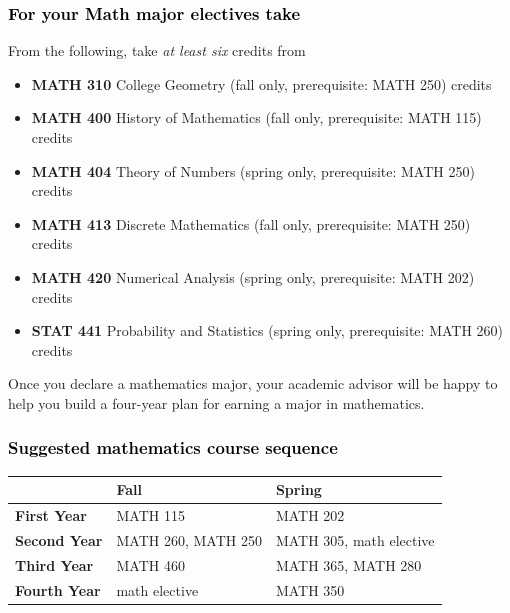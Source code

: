 \documentclass[10pt]{article}
\newcommand{\calconeshort}{MATH 115}
\newcommand{\calctwoshort}{MATH 202}
\newcommand{\foundationsshort}{MATH 250}
\newcommand{\calcthreeshort}{MATH 260}
\newcommand{\linearshort}{MATH 280}
\newcommand{\discrete}{\textbf{MATH 413} Discrete Mathematics  (fall only, prerequisite: MATH 250)\dotfill 3 credits}
\newcommand{\statistics}{\textbf{STAT 441} Probability and Statistics (spring only, prerequisite: MATH 260)  \dotfill  3 credits}
\newcommand{\diffeqshort}{MATH 305}
\newcommand{\abstractalgebrashort}{MATH 350}
\newcommand{\complexshort}{MATH 365}
\newcommand{\advancedcalcshort}{MATH 460}
\newcommand{\numerical}{\textbf{MATH 420}   Numerical Analysis   (spring only, prerequisite: MATH 202)\dotfill 3 credits}
\newcommand{\collegegeometry}{\textbf{MATH 310}	College Geometry (fall only,  prerequisite: MATH 250) \dotfill 3 credits}
\newcommand{\mathhistory}{\textbf{MATH 400} History of Mathematics (fall only,  prerequisite: MATH 115) \dotfill 3 credits}
\newcommand{\numbertheory}{\textbf{MATH 404} Theory of Numbers (spring only,  prerequisite: MATH 250) \dotfill 3 credits}
\newcommand{\mathBS}{
     \begin{center}
         \begin{tabular}[h]{| l | l | l|} 
            \hline
                       & \textbf{Fall}         &  \textbf{Spring}  \\ \hline 
            \textbf{First Year} & \calconeshort{}  & \calctwoshort \\  \hline
            \textbf{Second Year} &  \calcthreeshort{}, \foundationsshort & \diffeqshort, math elective \\ \hline
            \textbf{Third Year} & \advancedcalcshort              &  \complexshort{}, \linearshort \\ \hline
            \textbf{Fourth Year} & math elective &  \abstractalgebrashort  \\ \hline
         \end{tabular}
\end{center}}
\begin{document}
\subsubsection*{\textcolor{black}{For your Math major electives take}}

From the following, take \emph{at least six} credits from
\vspace{0.1in}

\begin{itemize}
\item \collegegeometry
\item \mathhistory
\item \numbertheory
\item \discrete
\item \numerical
\item \statistics
\end{itemize}

Once you declare a mathematics major, your academic advisor 
will be happy to help you build a four-year plan for earning a major 
in mathematics.

\subsubsection*{\textcolor{black}{Suggested mathematics course sequence}}

\mathBS
\end{document}
